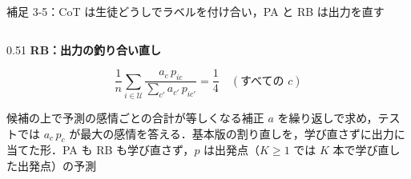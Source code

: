 \begin{frame}{補足 3-5：CoT は生徒どうしでラベルを付け合い，PA と RB は出力を直す}
\begin{columns}[T,onlytextwidth]
\begin{column}{0.51\textwidth}
      \vspace{0.2em}
      \textbf{\footnotesize RB：出力の釣り合い直し}\par\vspace{-0.3em}
      {\small\tighteq
      \begin{equation*}
        \frac{1}{n} \sum_{i \in \mathcal{U}} \frac{a_c\, p_{ic}}{\sum_{c'} a_{c'}\, p_{ic'}} = \frac{1}{4} \quad (\text{すべての } c)
      \end{equation*}}
      {\raggedright\scriptsize 候補の上で予測の感情ごとの合計が等しくなる補正 $a$ を繰り返しで求め，テストでは $a_c\, p_c$ が最大の感情を答える．基本版の割り直しを，学び直さずに出力に当てた形．PA も RB も学び直さず，$p$ は出発点（$K \ge 1$ では $K$ 本で学び直した出発点）の予測\par}
    \end{column}
  \end{columns}
\end{frame}

